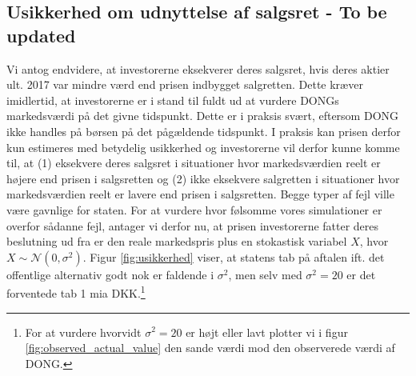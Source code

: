 \documentclass{article}
\begin{document}
%

\subsection{Usikkerhed om udnyttelse af salgsret - To be updated}

 Vi antog endvidere, at investorerne eksekverer deres salgsret, hvis deres aktier ult. 2017 var mindre værd end prisen indbygget salgretten. Dette kræver imidlertid, at investorerne er i stand til fuldt ud at vurdere DONGs markedsværdi på det givne tidspunkt. Dette er i praksis svært, eftersom DONG ikke handles på børsen på det pågældende tidspunkt. I praksis kan prisen derfor kun estimeres med betydelig usikkerhed og  investorerne vil derfor kunne komme til, at (1) eksekvere deres salgsret i situationer hvor markedsværdien reelt er højere end prisen i salgsretten og (2) ikke eksekvere salgretten i situationer hvor markedsværdien reelt er lavere end prisen i salgsretten. Begge typer af fejl ville være gavnlige for staten. For at vurdere hvor følsomme vores simulationer er overfor sådanne fejl, antager vi derfor nu, at prisen investorerne fatter deres beslutning ud fra er den reale markedspris plus en stokastisk variabel $X$, hvor $X \sim \mathcal{N}(0, \sigma^2)$. Figur \ref{fig:usikkerhed} viser, at statens tab på aftalen ift. det offentlige alternativ godt nok er faldende i $\sigma^2$, men selv med $\sigma^2=20$ er det forventede tab 1 mia DKK.\footnote{For at vurdere hvorvidt $\sigma^2=20$ er højt eller lavt plotter vi i figur \ref{fig:observed_actual_value} den sande værdi mod den observerede værdi af DONG.}
 
\end{document}
